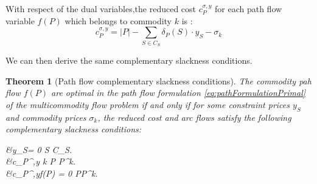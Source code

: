 \documentclass[14pt,a4paper]{article}
\newtheorem{theorem}{Theorem}[section]
\theoremstyle{definition}
\numberwithin{equation}{subsection}
\begin{document}
With respect of the dual variables,the reduced cost $c_P^{\sigma,y}$ for each path flow variable $f(P)$ which belongs to commodity $k$ is :
\begin{equation}
 c_P^{\sigma,y} = |P| - \sum\limits_{S \in C_S}   \delta_P(S)\cdot y_S -\sigma_k
\label{eq:reducedCost}
\end{equation}


We can then derive the same complementary slackness conditions.

\begin{theorem}[Path flow complementary slackness conditions]
	The commodity pah flow $f(P)$ are optimal in the path flow formulation \eqref{eq:pathFormulationPrimal} of the multicommodity flow problem if and only if for some constraint prices $y_S$ and commodity prices $\sigma_k$, the reduced cost and arc flows satisfy the following complementary slackness conditions: 
	\begin{flalign}
	&y_S= 0  S \in C_S. \label{eq:cond1}\\
	&c_P^{\sigma,y}   k \in [K] P \in P^k. \label{eq:cond2}\\
	&c_P^{\sigma,y}\cdot f(P) = 0  \in [K]  P\in P^k. \label{eq:cond3}
	\end{flalign}
	\label{theorem:slackcond}
\end{theorem}
\end{document}
